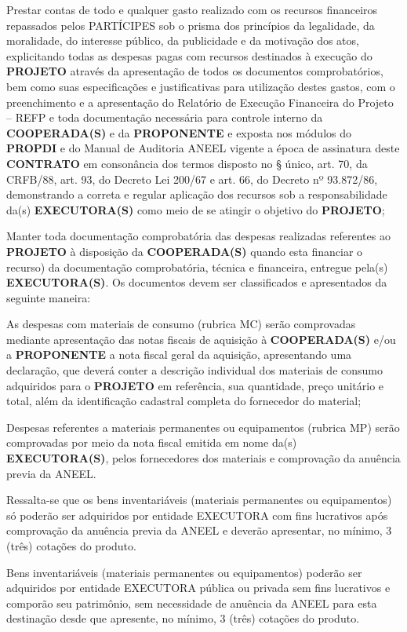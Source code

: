 \xx Prestar contas de todo e qualquer gasto realizado com os recursos financeiros repassados pelos PARTÍCIPES sob o prisma dos princípios da legalidade, da moralidade, do interesse público, da publicidade e da motivação dos atos, explicitando todas as despesas pagas com recursos destinados à execução do \textbf{PROJETO} através da apresentação de todos os documentos comprobatórios, bem como suas especificações e justificativas para utilização destes gastos, com o preenchimento e a apresentação do Relatório de Execução Financeira do Projeto – REFP e toda documentação necessária para controle interno da \textbf{COOPERADA(S)} e da \textbf{PROPONENTE} e exposta nos módulos do \textbf{PROPDI} e do Manual de Auditoria ANEEL vigente a época de assinatura deste \textbf{CONTRATO} em consonância dos termos disposto no § único, art. 70, da CRFB/88, art. 93, do Decreto Lei 200/67 e art. 66, do Decreto nº 93.872/86, demonstrando a correta e regular aplicação dos recursos sob a responsabilidade da(s) \textbf{EXECUTORA(S)} como meio de se atingir o objetivo do \textbf{PROJETO};

\xx Manter toda documentação comprobatória das despesas realizadas referentes ao \textbf{PROJETO} à disposição da \textbf{COOPERADA(S)} quando esta financiar o recurso) da documentação comprobatória, técnica e financeira, entregue pela(s) \textbf{EXECUTORA(S)}. Os documentos devem ser classificados e apresentados da seguinte maneira:

\xxx  As despesas com materiais de consumo (rubrica MC) serão comprovadas mediante apresentação das notas fiscais de aquisição à \textbf{COOPERADA(S)} e/ou a \textbf{PROPONENTE} a nota fiscal geral da aquisição, apresentando uma declaração, que deverá conter a descrição individual dos materiais de consumo adquiridos para o \textbf{PROJETO} em referência, sua quantidade, preço unitário e total, além da identificação cadastral completa do fornecedor do material;

\xxx  Despesas referentes a materiais permanentes ou equipamentos (rubrica MP) serão comprovadas por meio da nota fiscal emitida em nome da(s) \textbf{EXECUTORA(S)}, pelos fornecedores dos materiais e comprovação da anuência previa da ANEEL.

\xxxx Ressalta-se que os bens inventariáveis (materiais permanentes ou equipamentos) só poderão ser adquiridos por entidade EXECUTORA com fins lucrativos após comprovação da anuência previa da ANEEL e deverão apresentar, no mínimo, 3 (três) cotações do produto.

\xxxx Bens inventariáveis (materiais permanentes ou equipamentos) poderão ser adquiridos por entidade EXECUTORA pública ou privada sem fins lucrativos e comporão seu patrimônio, sem necessidade de anuência da ANEEL para esta destinação desde que apresente, no mínimo, 3 (três) cotações do produto.

